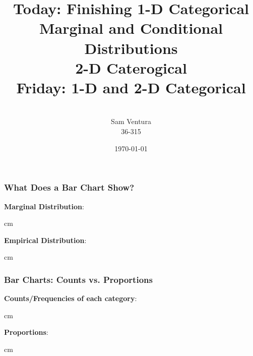 \documentclass{beamer} %
\begin{document}
\title[dedup]{Today:  Finishing 1-D Categorical \\ Marginal and Conditional Distributions \\ 2-D Caterogical \\ Friday:  1-D and 2-D Categorical}


\author[Samuel L. Ventura]{\\
  \large{Sam Ventura\\36-315}}
\date{\today}


\begin{frame}
	\maketitle
	
\end{frame}


\begin{frame}\frametitle{What Does a Bar Chart Show?}
	\small
	
	\textbf{Marginal Distribution}:  %
	
	 cm
	
	\textbf{Empirical Distribution}:  %
	
	
	
	 cm
	
\end{frame}


\begin{frame}\frametitle{Bar Charts:  Counts vs. Proportions}
	\small
	
	\textbf{Counts/Frequencies of each category}:  %
	
	
	 cm
	
	\textbf{Proportions}:  %
	
	
	
	
	 cm
	
\end{frame}
\end{document}
